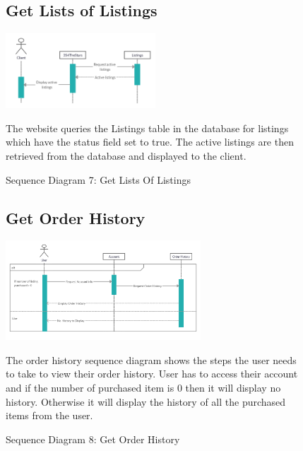 \documentclass[11pt]{article}
\newcounter{use case ID}
\begin{document}
\begin{figure}[ht!]
    \subsection{Get Lists of Listings}
    \centering
    \includegraphics[width=0.5\textwidth,height=0.15\paperheight]{Diagrams/Sequence/Lists_of_Listings.jpg}
    \caption{Sequence Diagram 7: Get Lists Of Listings}
    \label{fig: Get Lists Of Listings}
    \begin{justify}
        The website queries the Listings table in the database for listings which have the status field set to true. The active listings are then retrieved from the database and displayed to the client.
    \end{justify}
\end{figure}

\begin{figure}[ht!]
    \subsection{Get Order History}
    \centering
    \includegraphics[width=0.65\textwidth,height=0.2\paperheight]{Diagrams/Sequence/Order_History.png}
    \caption{Sequence Diagram 8: Get Order History}
    \label{fig: Get Order History}
    \begin{justify}
       The order history sequence diagram shows the steps the user needs to take to view their order history. User has to access their account and if the number of purchased item is 0 then it will display no history. Otherwise it will display the history of all the purchased items from the user.
    \end{justify}
\end{figure}
\end{document}
